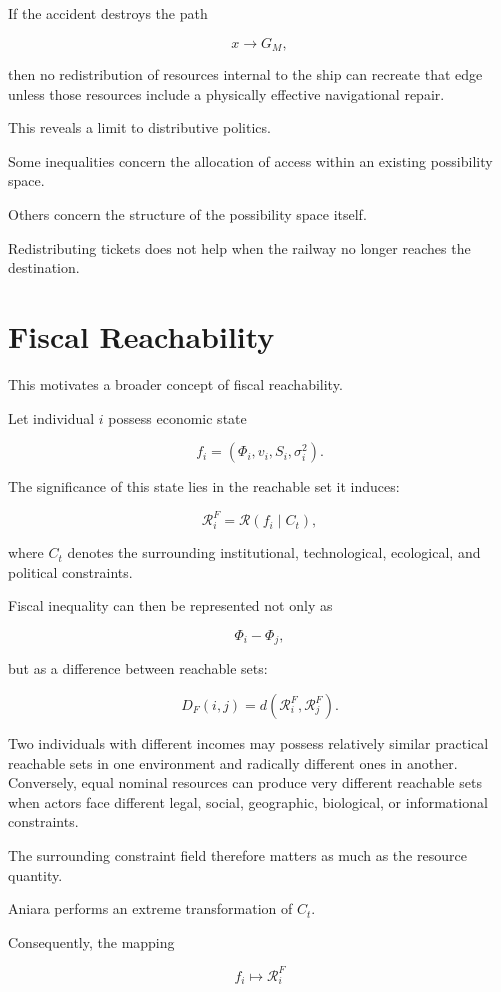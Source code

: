 \documentclass[11pt,oneside]{book}
\theoremstyle{definition}
\theoremstyle{remark}
\newcommand{\R}{\mathcal{R}}
\begin{document}
If the accident destroys the path

\[
x\rightarrow G_M,
\]

then no redistribution of resources internal to the ship can recreate that edge unless those resources include a physically effective navigational repair.

This reveals a limit to distributive politics.

Some inequalities concern the allocation of access within an existing possibility space.

Others concern the structure of the possibility space itself.

Redistributing tickets does not help when the railway no longer reaches the destination.

\section{Fiscal Reachability}

This motivates a broader concept of fiscal reachability.

Let individual \(i\) possess economic state

\[
f_i
=
(\Phi_i,v_i,S_i,\sigma_i^2).
\]

The significance of this state lies in the reachable set it induces:

\[
\R_i^{F}
=
\R(f_i\mid C_t),
\]

where \(C_t\) denotes the surrounding institutional, technological, ecological, and political constraints.

Fiscal inequality can then be represented not only as

\[
\Phi_i-\Phi_j,
\]

but as a difference between reachable sets:

\[
D_F(i,j)
=
d(
\R_i^{F},
\R_j^{F}
).
\]

Two individuals with different incomes may possess relatively similar practical reachable sets in one environment and radically different ones in another. Conversely, equal nominal resources can produce very different reachable sets when actors face different legal, social, geographic, biological, or informational constraints.

The surrounding constraint field therefore matters as much as the resource quantity.

Aniara performs an extreme transformation of \(C_t\).

Consequently, the mapping

\[
f_i\mapsto\R_i^{F}
\]
\end{document}
